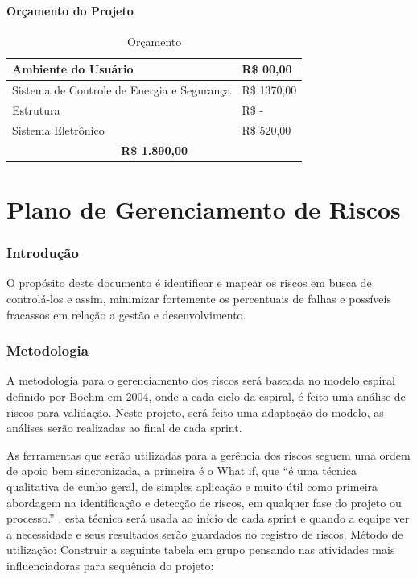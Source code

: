 \begin{apendicesenv}
\subsubsection{Orçamento do Projeto}
\begin{table}[htp]
    \centering
    \caption{Orçamento}
    \label{orcamento}
    \begin{tabular}{|l|l|}
    \hline
    Ambiente do Usuário & R\$ 00,00 \\ \hline
    Sistema de Controle de Energia e Segurança & R\$ 1370,00 \\ \hline
    Estrutura & R\$ - \\ \hline
    Sistema Eletrônico & R\$ 520,00 \\ \hline
    \multicolumn{2}{|c|}{\textbf{R\$ 1.890,00}} \\ \hline
    \end{tabular}
\end{table}
    

\chapter{Plano de Gerenciamento de Riscos}

\subsection{Introdução}
O propósito deste documento é identificar e mapear os riscos em busca de controlá-los e assim, minimizar fortemente os percentuais de falhas e possíveis fracassos em relação a gestão e desenvolvimento.

\subsection{Metodologia}
A metodologia para o gerenciamento dos riscos será baseada no modelo espiral definido por Boehm em 2004, onde a cada ciclo da espiral, é feito uma análise de riscos para validação. Neste projeto, será feito uma adaptação do modelo, as análises serão realizadas ao final de cada sprint.

As ferramentas que serão utilizadas para a gerência dos riscos seguem uma ordem de apoio bem sincronizada, a primeira é o What if, que “é uma técnica qualitativa de cunho geral, de simples aplicação e muito útil como primeira abordagem na identificação e detecção de riscos, em qualquer fase do projeto ou processo.” \cite{blogtek}, esta técnica será usada ao início de cada sprint e quando a equipe ver a necessidade e seus resultados serão guardados no registro de riscos. Método de utilização:
Construir a seguinte tabela em grupo pensando nas atividades mais influenciadoras para sequência do projeto:


\end{apendicesenv}
